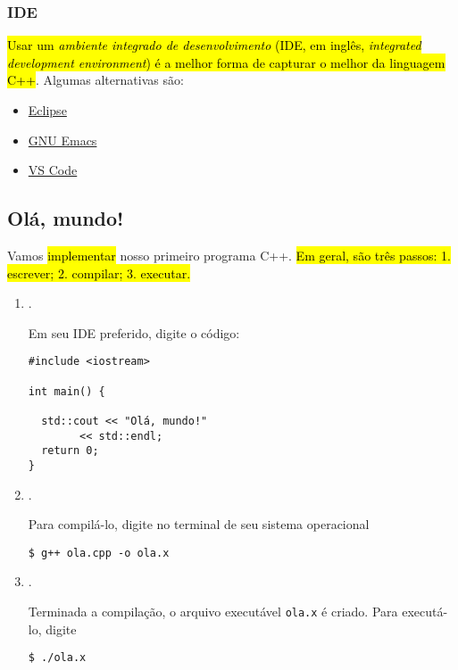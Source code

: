 \documentclass[12pt]{article}
\begin{document}
\subsubsection{IDE}

\hl{Usar um \emph{ambiente integrado de desenvolvimento} (IDE, em inglês, \textit{integrated development environment}) é a melhor forma de capturar o melhor da linguagem C++}. Algumas alternativas são:
\begin{itemize}
\item \href{https://www.eclipse.org/ide/}{Eclipse}
\item \href{https://www.gnu.org/software/emacs/download.html}{GNU Emacs}
\item \href{https://code.visualstudio.com/}{VS Code}
\end{itemize}

\subsection{Olá, mundo!}

Vamos \hl{implementar} nosso primeiro programa C++. \hl{Em geral, são três passos: 1. escrever; 2. compilar; 3. executar.}

\begin{enumerate}[1.]
\item {}.

  Em seu IDE preferido, digite o código:
\begin{lstlisting}[caption=ola.cpp]
#include <iostream>

int main() {
  
  std::cout << "Olá, mundo!"
	    << std::endl;
  return 0;
}
\end{lstlisting}
  
\item {}.

Para compilá-lo, digite no terminal de seu sistema operacional
\begin{lstlisting}
$ g++ ola.cpp -o ola.x
\end{lstlisting}

\item {}.

Terminada a compilação, o arquivo executável \lstinline+ola.x+ é criado. Para executá-lo, digite
\begin{lstlisting}
$ ./ola.x
\end{lstlisting}  
\end{enumerate}
\end{document}
